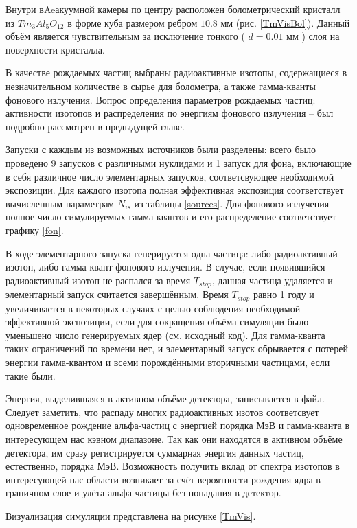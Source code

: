 \documentclass[a4paper,article,14pt]{extarticle}
\begin{document}
Внутри вAeакуумной камеры по центру расположен болометрический кристалл из $Tm_3Al_5O_{12}$ в форме куба размером ребром $ 10.8 \text{ мм}$ (рис. \ref{TmVisBol}). Данный объём является чувствительным за исключение тонкого ( $d = 0.01 \text{ мм}$ ) слоя на поверхности кристалла. 

В качестве рождаемых частиц выбраны радиоактивные изотопы, содержащиеся в незначительном количестве в сырье для болометра, а также гамма-кванты фонового излучения. Вопрос определения параметров рождаемых частиц: активности изотопов и распределения по энергиям фонового излучения -- был подробно рассмотрен в предыдущей главе.

Запуски с каждым из возможных источников были разделены: всего было проведено 9 запусков с различными нуклидами и 1 запуск для фона, включающие в себя различное число элементарных запусков, соответсвующее необходимой экспозиции. Для каждого изотопа полная эффективная экспозиция соответствует вычисленным параметрам $N_{is}$ из таблицы \ref{sources}. Для фонового излучения полное число симулируемых гамма-квантов и его распределение соответствует графику \ref{fon}.

В ходе элементарного запуска генерируется одна частица: либо радиоактивный изотоп, либо гамма-квант фонового излучения. В случае, если появившийся радиоактивный изотоп не распался за время $T_{stop}$, данная частица удаляется и элементарный запуск считается завершённым. Время $T_{stop}$ равно 1 году и увеличивается в некоторых случаях с целью соблюдения необходимой эффективной экспозиции, если  для сокращения объёма симуляции было уменьшено число генерируемых ядер (см. исходный код). Для гамма-кванта таких ограничений по времени нет, и элементарный запуск обрывается с потерей энергии гамма-квантом и всеми порождёнными вторичными частицами, если такие были.

Энергия, выделившаяся в активном объёме детектора, записывается в файл. Следует заметить, что распаду многих радиоактивных изотов соответсвует одновременное рождение альфа-частиц с энергией порядка МэВ и гамма-кванта в интересующем нас кэвном диапазоне. Так как они находятся в активном объёме детектора, им сразу регистрируется суммарная энергия данных частиц, естественно, порядка МэВ. Возможность получить вклад от спектра изотопов в интересующей нас области возникает за счёт вероятности рождения ядра в граничном слое и улёта альфа-частицы без попадания в детектор.

Визуализация симуляции представлена на рисунке \ref{TmVis}.
\end{document}

